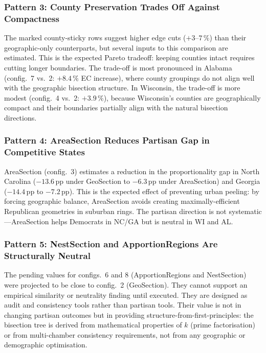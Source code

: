 \subsubsection*{Pattern 3: County Preservation Trades Off Against Compactness}

The marked county-sticky rows suggest higher edge cuts ($+3$--$7\,\%$) than
their geographic-only counterparts, but several inputs to this comparison are
estimated.
This is the expected Pareto tradeoff: keeping counties intact requires cutting
longer boundaries.
The trade-off is most pronounced in Alabama (config.~7 vs.~2: $+8.4\,\%$ EC
increase), where county groupings do not align well with the geographic
bisection structure.
In Wisconsin, the trade-off is more modest (config.~4 vs.~2: $+3.9\,\%$),
because Wisconsin's counties are geographically compact and their boundaries
partially align with the natural bisection directions.

\subsubsection*{Pattern 4: AreaSection Reduces Partisan Gap in Competitive States}

AreaSection (config.~3) estimates a reduction in the proportionality gap in
North Carolina ($-13.6$\,pp under GeoSection to $-6.3$\,pp under AreaSection)
and Georgia ($-14.4$\,pp to $-7.2$\,pp).
This is the expected effect of preventing urban peeling: by forcing geographic
balance, AreaSection avoids creating maximally-efficient Republican geometries
in suburban rings.
The partisan direction is not systematic---AreaSection helps Democrats in NC/GA
but is neutral in WI and AL.

\subsubsection*{Pattern 5: NestSection and ApportionRegions Are Structurally Neutral}

The pending values for configs.~6 and 8 (ApportionRegions and NestSection) were
projected to be close to config.~2 (GeoSection). They cannot support an
empirical similarity or neutrality finding until executed.
They are designed as audit and consistency tools rather than partisan tools.
Their value is not in changing partisan outcomes but in providing
structure-from-first-principles: the bisection tree is derived from mathematical
properties of $k$ (prime factorisation) or from multi-chamber consistency
requirements, not from any geographic or demographic optimisation.


